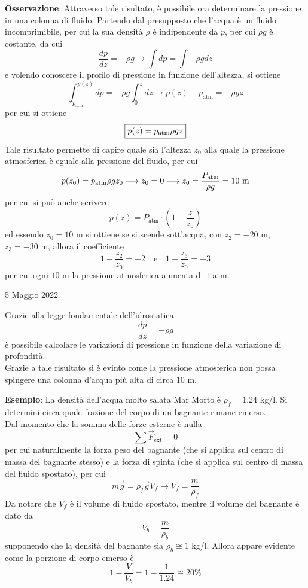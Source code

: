 \documentclass[a4paper]{extarticle}
\begin{document}
\vspace{1em}
\noindent
\textbf{Osservazione}: Attraverso tale risultato, è possibile ora determinare la pressione in una colonna di fluido. Partendo dal presupposto che l'acqua è un fluido incomprimibile, per cui la sua densità $\rho$ è indipendente da $p$, per cui $\rho g$ è costante, da cui
\[\frac{dp}{dz} = - \rho g \longrightarrow \int dp = \int - \rho g dz\]
e volendo conoscere il profilo di pressione in funzione dell'altezza, si ottiene
\[\int_{p_{\text{atm}}} ^{p(z)} dp = - \rho g \int_0^z dz \longrightarrow p(z) - p_{\text{atm}} = - \rho g z\]
per cui si ottiene
\[\boxed{p(z)=p_{\text{atm}}\-\rho g z}\]
Tale risultato permette di capire quale sia l'altezza $z_0$ alla quale la pressione atmosferica è eguale alla pressione del fluido, per cui
\[p(z_0)=p_{\text{atm}}\-\rho g z_0 \longrightarrow z_0 = 0 \longrightarrow z_0 = \frac{P_{\text{atm}}}{\rho g} = 10 \text{ m}\]
per cui si può anche scrivere
\[p(z)=P_{\text{atm}} \cdot \left(1-\frac{z}{z_0} \right)\]
ed essendo $z_0=10 $ m si ottiene se si scende sott'acqua, con $z_2=-20$ m, $z_3=-30$ m, allora il coefficiente
\[1-\frac{z_2}{z_0} = -2 \hspace{1em} \text{e} \hspace{1em} 1-\frac{z_3}{z_0} = -3\]
per cui ogni $10$ m la pressione atmosferica aumenta di $1$ atm.

\newpage
\noindent
\begin{center}
  5 Maggio 2022
\end{center}
Grazie alla legge fondamentale dell'idrostatica
\[\boxed{\frac{dp}{dz} = - \rho g}\]
è possibile calcolare le variazioni di pressione in funzione della variazione di profondità.\\
Grazie a tale risultato si è evinto come la pressione atmosferica non possa spingere una colonna d'acqua più alta di circa $10$ m.

\vspace{1em}
\noindent
\textbf{Esempio}: La densità dell'acqua molto salata Mar Morto è $\rho_f=1.24$ kg/l. Si determini circa quale frazione del corpo di un bagnante rimane emerso.\\
Dal momento che la somma delle forze esterne è nulla
\[\sum \vec{F}_{\text{ext}} = 0\]
per cui naturalmente la forza peso del bagnante (che si applica sul centro di massa del bagnante stesso) e la forza di spinta (che si applica sul centro di massa del fluido spostato), per cui
\[m \vec g = \rho_f \vec g V_{f} \longrightarrow V_{f} = \frac{m}{\rho_f}\]
Da notare che $V_f$ è il volume di fluido spostato, mentre il volume del bagnante è dato da
\[V_b = \frac{m}{\rho_b}\]
supponendo che la densità del bagnante sia $\rho_b \cong 1$ kg/l. Allora appare evidente come la porzione di corpo emerso è
\[1-\frac{V}{V_b}=1-\frac{1}{1.24} \cong 20\%\]
\end{document}
